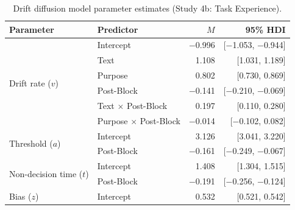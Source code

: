 \documentclass[pdflatex,sn-nature]{sn-jnl}
\begin{document}
\begin{appendices}
\begin{table}[htbp]
\caption{Drift diffusion model parameter estimates (Study 4b: Task Experience).}
\label{tab:S22}
\begin{tabular*}{\textwidth}{@{\extracolsep{\fill}}llrr@{}}
\toprule
Parameter & Predictor & $M$ & 95\% HDI \\
\midrule
\multirow{6}{*}{Drift rate ($v$)} & Intercept & $-$0.996 & [$-$1.053, $-$0.944] \\
 & Text                              & 1.108  & [1.031, 1.189]   \\
 & Purpose                           & 0.802  & [0.730, 0.869]   \\
 & Post-Block                        & $-$0.141 & [$-$0.210, $-$0.069] \\
 & Text $\times$ Post-Block          & 0.197  & [0.110, 0.280]   \\
 & Purpose $\times$ Post-Block       & $-$0.014 & [$-$0.102, 0.082] \\
\midrule
\multirow{2}{*}{Threshold ($a$)} & Intercept & 3.126 & [3.041, 3.220] \\
 & Post-Block                        & $-$0.161 & [$-$0.249, $-$0.067] \\
\midrule
\multirow{2}{*}{Non-decision time ($t$)} & Intercept & 1.408 & [1.304, 1.515] \\
 & Post-Block                        & $-$0.191 & [$-$0.256, $-$0.124] \\
\midrule
Bias ($z$) & Intercept & 0.532 & [0.521, 0.542] \\
\bottomrule
\end{tabular*}
\end{table}

\end{appendices}
\end{document}
